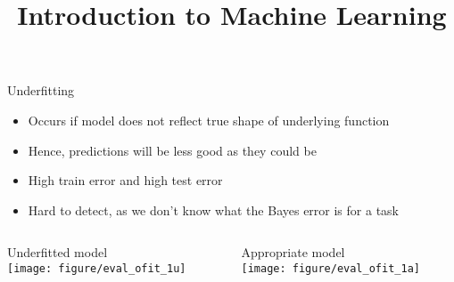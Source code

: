 \documentclass[11pt,compress,t,notes=noshow, xcolor=table]{beamer}
\title{Introduction to Machine Learning}
\begin{document}



\begin{vbframe}{Underfitting}

\begin{itemize}
  \item Occurs if model does not reflect true shape of underlying
      function
  \item Hence, predictions will be less good as they could be
  \item High train error and high test error
  \item Hard to detect, as we don't know what the Bayes error is for a task
\end{itemize}
\lz
\begin{columns}
\begin{column}{0.5\textwidth}
  \raggedright
  Underfitted model\\
  \texttt{[image: figure/eval\_ofit\_1u]}
\end{column}
\begin{column}{0.5\textwidth}
  \raggedright
  Appropriate model\\
  \texttt{[image: figure/eval\_ofit\_1a]}
\end{column}
\end{columns}
\end{vbframe}
\end{document}
